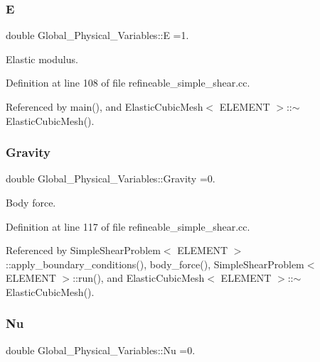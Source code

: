\subsubsection{\texorpdfstring{E}{E}}
{\footnotesize\ttfamily double Global\+\_\+\+Physical\+\_\+\+Variables\+::E =1.}



Elastic modulus. 



Definition at line 108 of file refineable\+\_\+simple\+\_\+shear.\+cc.



Referenced by main(), and Elastic\+Cubic\+Mesh$<$ E\+L\+E\+M\+E\+N\+T $>$\+::$\sim$\+Elastic\+Cubic\+Mesh().

\mbox{\label{namespaceGlobal__Physical__Variables_a8b80d3e8d63b8d0a0ed435a2dd7fe2ad}} 
\subsubsection{\texorpdfstring{Gravity}{Gravity}}
{\footnotesize\ttfamily double Global\+\_\+\+Physical\+\_\+\+Variables\+::\+Gravity =0.}



Body force. 



Definition at line 117 of file refineable\+\_\+simple\+\_\+shear.\+cc.



Referenced by Simple\+Shear\+Problem$<$ E\+L\+E\+M\+E\+N\+T $>$\+::apply\+\_\+boundary\+\_\+conditions(), body\+\_\+force(), Simple\+Shear\+Problem$<$ E\+L\+E\+M\+E\+N\+T $>$\+::run(), and Elastic\+Cubic\+Mesh$<$ E\+L\+E\+M\+E\+N\+T $>$\+::$\sim$\+Elastic\+Cubic\+Mesh().

\mbox{\label{namespaceGlobal__Physical__Variables_a3962c36313826b19f216f6bbbdd6a477}} 
\subsubsection{\texorpdfstring{Nu}{Nu}}
{\footnotesize\ttfamily double Global\+\_\+\+Physical\+\_\+\+Variables\+::\+Nu =0.}



